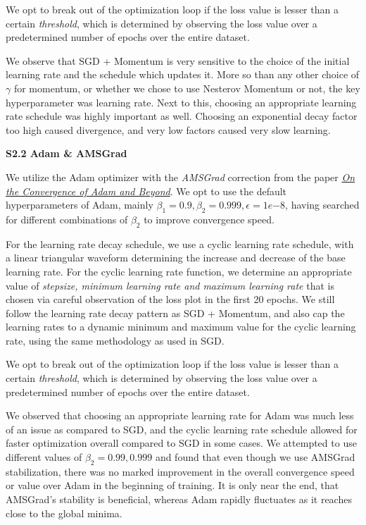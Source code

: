 \documentclass[11pt]{report}
\begin{document}
We opt to break out of the optimization loop if the loss value is lesser than a certain \textit{threshold}, which is determined by observing the loss value over a predetermined number of epochs over the entire dataset.

We observe that SGD + Momentum is very sensitive to the choice of the initial learning rate and the schedule which updates it. More so than any other choice of $\gamma$ for momentum, or whether we chose to use Nesterov Momentum or not, the key hyperparameter was learning rate. Next to this, choosing an appropriate learning rate schedule was highly important as well. Choosing an exponential decay factor too high caused divergence, and very low factors caused very slow learning.

{\bf S2.2 Adam \& AMSGrad}

We utilize the Adam optimizer with the \textit{AMSGrad} correction from the paper \href{https://openreview.net/forum?id=ryQu7f-RZ}{\textit{On the Convergence of Adam and Beyond}}. We opt to use the default hyperparameters of Adam, mainly $\beta_1 = 0.9, \beta_2 = 0.999, \epsilon = 1e{-8}$, having searched for different combinations of $\beta_2$ to improve convergence speed.

For the learning rate decay schedule, we use a cyclic learning rate schedule, with a linear triangular waveform determining the increase and decrease of the base learning rate. For the cyclic learning rate function, we determine an appropriate value of \textit{stepsize, minimum learning rate and maximum learning rate} that is chosen via careful observation of the loss plot in the first 20 epochs. We still follow the learning rate decay pattern as SGD + Momentum, and also cap the learning rates to a dynamic minimum and maximum value for the cyclic learning rate, using the same methodology as used in SGD.

We opt to break out of the optimization loop if the loss value is lesser than a certain \textit{threshold}, which is determined by observing the loss value over a predetermined number of epochs over the entire dataset.

We observed that choosing an appropriate learning rate for Adam was much less of an issue as compared to SGD, and the cyclic learning rate schedule allowed for faster optimization overall compared to SGD in some cases. We attempted to use different values of $\beta_2 = {0.99, 0.999}$ and found that even though we use AMSGrad stabilization, there was no marked improvement in the overall convergence speed or value over Adam in the beginning of training. It is only near the end, that AMSGrad's stability is beneficial, whereas Adam rapidly fluctuates as it reaches close to the global minima. 
\end{document}
